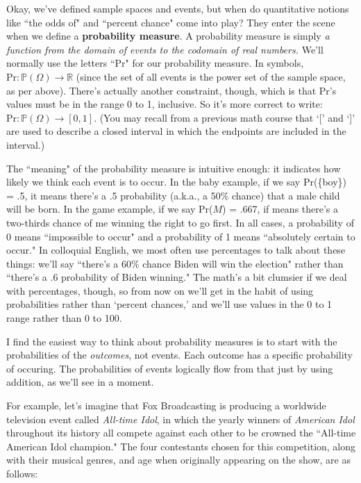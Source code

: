 
Okay, we've defined sample spaces and events, but when do quantitative
notions like ``the odds of" and ``percent chance" come into play? They
enter the scene when we define a \textbf{probability measure}. A
probability measure is simply \textit{a function from the domain of events
to the codomain of real numbers.} We'll normally use the letters ``Pr" for
our probability measure. In symbols, $\text{Pr}:\mathbb{P}(\Omega) \to
\mathbb{R}$ (since the set of all events is the power set of the sample
space, as per above). There's actually another constraint, though, which is
that Pr's values must be in the range 0 to 1, inclusive. So it's more
correct to write: $\text{Pr}:\mathbb{P}(\Omega)\to [0,1]$. (You may recall
from a previous math course that `[' and `]' are used to describe a closed
interval in which the endpoints are included in the interval.)

The ``meaning" of the probability measure is intuitive enough: it indicates
how likely we think each event is to occur. In the baby example, if we say
Pr(\{boy\}) = .5, it means there's a .5 probability (a.k.a., a 50\% chance)
that a male child will be born. In the game example, if we say Pr($M$) =
.667, if means there's a two-thirds chance of me winning the right to go
first. In all cases, a probability of 0 means ``impossible to occur" and a
probability of 1 means ``absolutely certain to occur." In colloquial
English, we most often use percentages to talk about these things: we'll
say ``there's a 60\% chance Biden will win the election" rather than
``there's a .6 probability of Biden winning." The math's a bit clumsier
if we deal with percentages, though, so from now on we'll get in the
habit of using probabilities rather than `percent chances,' and we'll use
values in the 0 to 1 range rather than 0 to 100.

I find the easiest way to think about probability measures is to start with
the probabilities of the \textit{outcomes}, not events. Each outcome has a
specific probability of occuring. The probabilities of events logically
flow from that just by using addition, as we'll see in a moment. 

For example, let's imagine that Fox Broadcasting is producing a worldwide
television event called \textit{All-time Idol}, in which the yearly winners
of \textit{American Idol} throughout its history all compete against each
other to be crowned the ``All-time American Idol champion." The four
contestants chosen for this competition, along with their musical genres,
and age when originally appearing on the show, are as follows:

